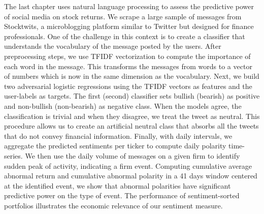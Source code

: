 \clearpage
The last chapter uses natural language processing to assess the predictive power of social media on stock returns. We scrape a large sample of messages from Stocktwits, a microblogging platform similar to Twitter but designed for finance professionals. One of the challenge in this context is to create a classifier that understands the vocabulary of the message posted by the users. After preprocessing steps, we use TFIDF vectorization to compute the importance of each word in the message. This transforms the messages from words to a vector of numbers which is now in the same dimension as the vocabulary. Next, we build two adversarial logistic regressions using the TFIDF vectors as features and the user-labels as targets. The first (second) classifier sets bullish (bearish) as positive and non-bullish (non-bearish) as negative class. When the models agree, the classification is trivial and when they disagree, we treat the tweet as neutral. This procedure allows us to create an artificial neutral class that absorbs all the tweets that do not convey financial information. Finally, with daily intervals, we aggregate the predicted sentiments per ticker to compute daily polarity time-series. We then use the daily volume of messages on a given firm to identify sudden peak of activity, indicating a firm event. Computing cumulative average abnormal return and cumulative abnormal polarity in a 41 days window centered at the identified event, we show that abnormal polarities have significant predictive power on the type of event. The performance of sentiment-sorted portfolios illustrates the economic relevance of our sentiment measure.



